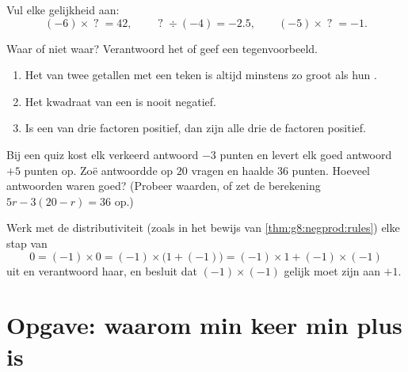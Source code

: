\begin{exercise}[$\star\star$]\label{exo:g8:negprod:8}
Vul elke gelijkheid aan:
\[
(-6) \times \;?\; = 42, \qquad
\;?\; \div (-4) = -2.5, \qquad
(-5) \times \;?\; = -1 .
\]
\end{exercise}

\begin{exercise}[$\star\star$]\label{exo:g8:negprod:9}
Waar of niet waar? Verantwoord het of geef een tegenvoorbeeld.
\begin{enumerate}
  \item Het  van twee getallen met een teken is altijd minstens zo groot als
        hun .
  \item Het kwadraat van een  is nooit negatief.
  \item Is een  van drie factoren positief, dan zijn alle drie de factoren
        positief.
\end{enumerate}
\end{exercise}

\begin{exercise}[$\star\star$]\label{exo:g8:negprod:10}
Bij een quiz kost elk verkeerd antwoord $-3$ punten en levert elk goed antwoord $+5$
punten op. Zoë antwoordde op $20$ vragen en haalde $36$ punten. Hoeveel antwoorden
waren goed? (Probeer waarden, of zet de berekening $5r - 3(20 - r) = 36$ op.)
\end{exercise}

\begin{exercise}[$\star\star\star$]\label{exo:g8:negprod:11}
Werk met de distributiviteit (zoals in het bewijs van
\cref{thm:g8:negprod:rules}) elke stap van
\[
0 = (-1) \times 0 = (-1) \times \bigl(1 + (-1)\bigr)
= (-1) \times 1 + (-1) \times (-1)
\]
uit en verantwoord haar, en besluit dat $(-1) \times (-1)$ gelijk moet zijn aan $+1$.
\end{exercise}

\section{Opgave: waarom min keer min plus is}

